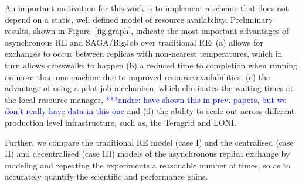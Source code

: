 \documentclass{rspublic}
\newcommand{\jhanote}[1]{ {\textcolor{red} { ***shantenu: #1 }}}
\newcommand{\alnote}[1]{ {\textcolor{blue} { ***andre: #1 }}}
\newcommand{\athotanote}[1]{ {\textcolor{green} { ***athota: #1 }}}
\newcommand{\alnote}[1]{}
\newcommand{\athotanote}[1]{}
\newcommand{\jhanote}[1]{}
\begin{document}
An important motivation for this work is to implement a scheme that does not depend on a
static, well defined model of resource availability. %
Preliminary results, shown in Figure~\ref{fig:graph}, indicate the
most important advantages of asynchronous RE and SAGA/BigJob over
traditional RE: (a) allows for exchanges to occur between replicas
with non-nearest temperatures, which in turn allows crosswalks to
happen (b) a reduced time to completion when running on more than one
machine due to improved resource availabilities, (c) the advantage of
using a pilot-job mechanism, which eliminates the waiting times at the
local resource manager, \alnote{have shown this in prev. papers, but
  we don't really have data in this one} and (d) the ability to scale
out across different production level infrastructure, such as, the
Teragrid and LONI.

Further, we compare the traditional RE model (case I) and the centralised (case II) and decentralised (case III) models of the asynchronous replica exchange by modeling and repeating the experiments a reasonable number of times, so as to accurately quantify the scientific and performance gains. %


 
\end{document}
